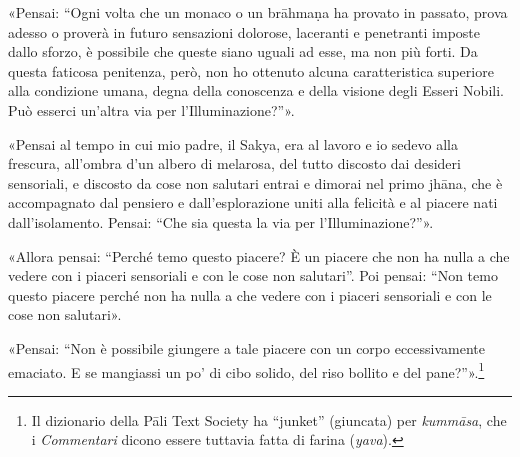 
«Pensai: “Ogni volta che un monaco o un brāhmaṇa ha provato in passato, prova
adesso o proverà in futuro sensazioni dolorose, laceranti e penetranti imposte
dallo sforzo, è possibile che queste siano uguali ad esse, ma non più forti. Da
questa faticosa penitenza, però, non ho ottenuto alcuna caratteristica superiore
alla condizione umana, degna della conoscenza e della visione degli Esseri
Nobili. Può esserci un’altra via per l’Illuminazione?”».

«Pensai al tempo in cui mio padre, il Sakya, era al lavoro e io sedevo alla
frescura, all’ombra d’un albero di melarosa, del tutto discosto dai desideri
sensoriali, e discosto da cose non salutari entrai e dimorai nel primo
jhāna,
che è accompagnato dal pensiero e dall’esplorazione uniti alla felicità e al
piacere nati dall’isolamento.
Pensai: “Che sia questa la via per l’Illuminazione?”».

«Allora pensai: “Perché temo questo piacere? È un piacere che non ha nulla a che
vedere con i piaceri sensoriali e con le cose non salutari”. Poi pensai: “Non
temo questo piacere perché non ha nulla a che vedere con i piaceri sensoriali e
con le cose non salutari».

«Pensai: “Non è possibile giungere a tale piacere con un corpo eccessivamente
emaciato. E se mangiassi un po’ di cibo solido, del riso bollito e del
pane?”».\footnote{Il dizionario della Pāli Text Society ha “junket” (giuncata)
  per \emph{kummāsa}, che i \emph{Commentari} dicono essere tuttavia fatta di
  farina (\emph{yava}).}

